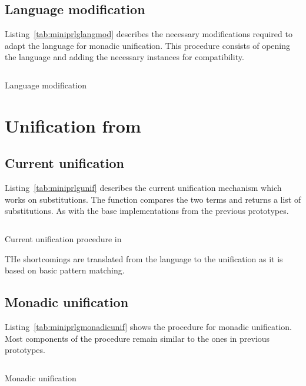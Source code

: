 \documentclass[thesis-solanki.tex]{files}
\begin{document}
\subsection{Language modification}
Listing~\ref{tab:miniprlglangmod} describes the necessary modifications required to adapt the language for monadic unification.
This procedure consists of opening the language and adding the necessary instances for  \cite{unification-fd-lib}
compatibility.

\begin{code-list}[H]
\begin{singlespace}
  \inputminted[linenos, firstline=64, lastline=87]{haskell}{haskell-proto3-uplift-apart.hs}
\end{singlespace}
\caption{Language modification}
\label{tab:miniprlglangmod}
\end{code-list}

\section{Unification from  \cite{website:mini-prolog-hugs98}}

\subsection{Current unification}

Listing~\ref{tab:miniprlgunif} describes the current unification mechanism which works on  substitutions. The 
 function compares the two terms and returns a list of substitutions. As with the base implementations from
the previous prototypes.

\begin{code-list}[H]
\begin{singlespace}
  \inputminted[linenos, firstline=67, lastline=95]{haskell}{haskell-proto3-pentyl-skater.hs}
\end{singlespace}
\caption{Current unification procedure in \cite{website:mini-prolog-hugs98}}
\label{tab:miniprlgunif}
\end{code-list}

THe shortcomings are translated from the language to the unification as it is based on basic pattern matching.

\subsection{Monadic unification}
Listing~\ref{tab:miniprlgmonadicunif} shows the procedure for monadic unification. Most components of the procedure remain similar to the ones
in previous prototypes.
\begin{code-list}[H]
\begin{singlespace}
  \inputminted[linenos, firstline=1, lastline=42]{haskell}{haskell-proto3-bevy-icebox.hs}
\end{singlespace}
\caption{Monadic unification}
\label{tab:miniprlgmonadicunif}
\end{code-list}
\end{document}

